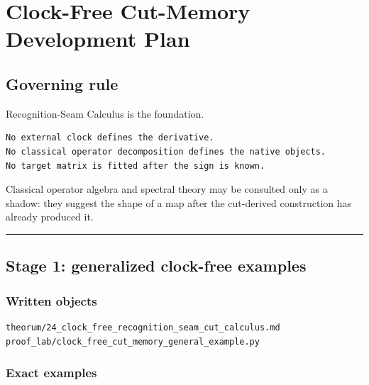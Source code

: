 \hypertarget{clock-free-cut-memory-development-plan}{%
\chapter{Clock-Free Cut-Memory Development Plan}\label{clock-free-cut-memory-development-plan}}

\hypertarget{governing-rule}{%
\section{Governing rule}\label{governing-rule}}

Recognition-Seam Calculus is the foundation.

\begin{verbatim}
No external clock defines the derivative.
No classical operator decomposition defines the native objects.
No target matrix is fitted after the sign is known.
\end{verbatim}

Classical operator algebra and spectral theory may be consulted only as a
shadow: they suggest the shape of a map after the cut-derived construction has
already produced it.

\begin{center}\rule{0.5\linewidth}{0.5pt}\end{center}

\hypertarget{stage-1-generalized-clock-free-examples}{%
\section{Stage 1: generalized clock-free examples}\label{stage-1-generalized-clock-free-examples}}

\hypertarget{written-objects}{%
\subsection{Written objects}\label{written-objects}}

\begin{verbatim}
theorum/24_clock_free_recognition_seam_cut_calculus.md
proof_lab/clock_free_cut_memory_general_example.py
\end{verbatim}

\hypertarget{exact-examples}{%
\subsection{Exact examples}\label{exact-examples}}

